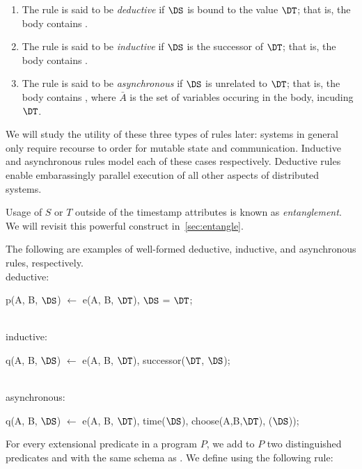 \begin{enumerate}
%
\item The rule is said to be {\em deductive} if $\DS$ is bound to the
value $\DT$; that is, the body contains \dedalus{$\DS$ = $\DT$}.
%
\item The rule is said to be {\em inductive} if $\DS$ is the successor of
$\DT$; that is, the body contains .
%
\item The rule is said to be {\em asynchronous} if $\DS$ is unrelated to $\DT$;
that is, the body contains , where $\bar{A}$ is the set of variables occuring in the body, incuding $\DT$.
\end{enumerate}

We will study the utility of these three types of rules later: systems in general only require recourse to order for mutable state and communication.  Inductive and asynchronous rules model each of these cases respectively.  Deductive rules enable embarassingly parallel execution of all other aspects of distributed systems. 

Usage of $S$ or $T$ outside of the timestamp attributes is known as {\em entanglement}.  We will revisit this powerful construct in~\ref{sec:entangle}. 

\begin{example}
The following are examples of well-formed deductive, inductive, and asynchronous rules, respectively.
\\
deductive:
\begin{Dedalus}
p(A, B, \(\DS\)) \(\leftarrow\) e(A, B, \(\DT\)), \(\DS\) = \(\DT\);
\end{Dedalus}
\\
inductive:
\begin{Dedalus}
q(A, B, \(\DS\)) \(\leftarrow\) e(A, B, \(\DT\)), successor(\(\DT\), \(\DS\));
\end{Dedalus}
\\
asynchronous:
\begin{Dedalus}
q(A, B, \(\DS\)) \(\leftarrow\) e(A, B, \(\DT\)), time(\(\DS\)), choose(A,B,\(\DT\)), (\(\DS\)));
\end{Dedalus}
\end{example}

For every extensional predicate  in a \lang program $P$, we add to
$P$ two distinguished predicates  and  with the same schema
as .  We define  using the following rule:

